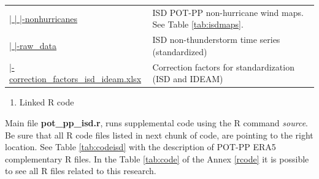 \documentclass[12pt,twoside]{reedthesis}
\providecommand{\tightlist}{%
  \setlength{\itemsep}{0pt}\setlength{\parskip}{0pt}}
\begin{document}
\begin{longtable}[t]{>{\raggedright\arraybackslash}p{2.2in}>{\raggedright\arraybackslash}p{4in}}
\href{ftp://ftp.geocorp.co/windthesis/potpp/isd/maps/nonhurricanes/}{  |    |    |-nonhurricanes} & ISD POT-PP non-hurricane wind maps. See Table \ref{tab:isdmaps}.\\
\href{ftp://ftp.geocorp.co/windthesis/potpp/isd/raw_data/}{  |    |-raw\_data} & ISD non-thunderstorm time series (standardized)\\
\href{ftp://ftp.geocorp.co/windthesis/potpp/correction_factors_isd_ideam.xlsx}{  |-correction\_factors\_isd\_ideam.xlsx} & Correction factors for standardization (ISD and IDEAM)\\
\bottomrule
\end{longtable}
\endgroup{}
\begin{enumerate}
\def\labelenumi{\arabic{enumi}.}
\setcounter{enumi}{3}
\tightlist
\item
  Linked R code
\end{enumerate}
Main file \textbf{pot\_pp\_isd.r}, runs supplemental code using the R command \emph{source}. Be sure that all R code files listed in next chunk of code, are pointing to the right location. See Table \ref{tab:codeisd} with the description of POT-PP ERA5 complementary R files. In the Table \ref{tab:code} of the Annex \ref{rcode} it is possible to see all R files related to this research.

\scriptsize
\end{document}
